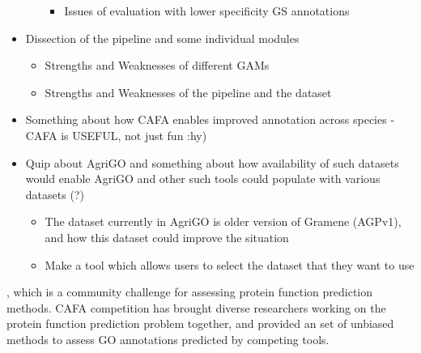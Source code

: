 \begin{itemize}
\begin{itemize}
\begin{itemize}
      \item Issues of evaluation with lower specificity GS annotations
    \end{itemize}
  \end{itemize}
  \item Dissection of the pipeline and some individual modules
  \begin{itemize}
    \item Strengths and Weaknesses of different GAMs
    \item Strengths and Weaknesses of the pipeline and the dataset
  \end{itemize}
  \item Something about how CAFA enables improved annotation across species - CAFA is USEFUL, not just fun :hy)
  \item Quip about AgriGO and something about how availability of such datasets would enable AgriGO and other such tools could populate with various datasets (?)
    \begin{itemize}
      \item The dataset currently in AgriGO is older version of Gramene (AGPv1), and how this dataset could improve the situation
      \item Make a tool which allows users to select the dataset that they want to use
    \end{itemize}
\end{itemize}

, which is a community challenge for assessing protein function prediction methods. CAFA competition has brought diverse researchers working on the protein function prediction problem together, and provided an set of unbiased methods to assess GO annotations predicted by competing tools.